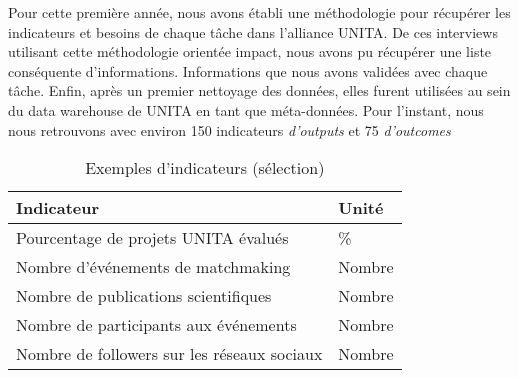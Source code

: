 Pour cette première année, nous avons établi une méthodologie pour récupérer les indicateurs et besoins de chaque tâche dans l'alliance UNITA. De ces interviews utilisant cette méthodologie orientée impact, nous avons pu récupérer une liste conséquente d'informations. Informations que nous avons validées avec chaque tâche. Enfin, après un premier nettoyage des données, elles furent utilisées au sein du data warehouse de UNITA en tant que méta-données. Pour l'instant, nous nous retrouvons avec environ 150 indicateurs \textit{d'outputs} et 75 \textit{d'outcomes}

\begin{table}[h] \caption{Exemples d'indicateurs (sélection)} \begin{center} \begin{tabular}{|l|l|} \hline \textbf{Indicateur} & \textbf{Unité} \\ \hline Pourcentage de projets UNITA évalués & \% \\ \hline Nombre d'événements de matchmaking & Nombre \\ \hline Nombre de publications scientifiques & Nombre \\ \hline Nombre de participants aux événements & Nombre \\ \hline Nombre de followers sur les réseaux sociaux & Nombre \\ \hline \end{tabular} \end{center} \end{table}

\vspace{-16px}